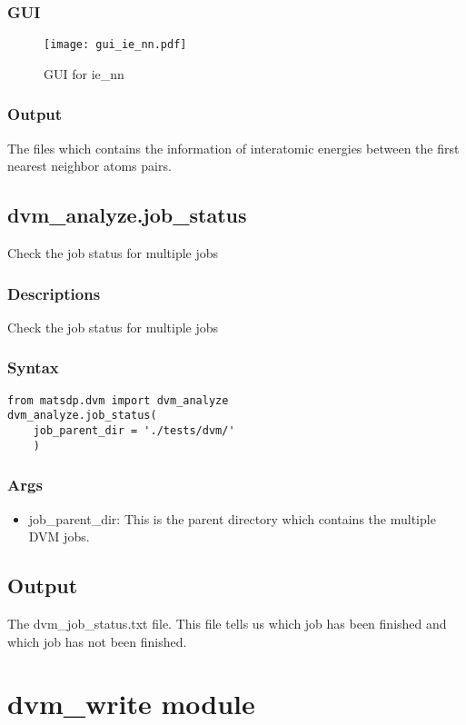 \documentclass[12pt]{book}
\begin{document}
\subsubsection{GUI}
\begin{figure}[htbp]
\centering
\texttt{[image: gui\_ie\_nn.pdf]}
\caption{GUI for ie\_nn}
\label{fig:GUI_ie_nn}
\end{figure}

\subsubsection{Output}

The files which contains the information of interatomic energies between the first nearest neighbor atoms pairs.

\subsection{dvm\_analyze.job\_status}
Check the job status for multiple jobs

\subsubsection{Descriptions}
Check the job status for multiple jobs
\subsubsection{Syntax}
\begin{lstlisting}
from matsdp.dvm import dvm_analyze
dvm_analyze.job_status(
    job_parent_dir = './tests/dvm/'
    )
\end{lstlisting}
\subsubsection{Args}
\begin{itemize}
\item job\_parent\_dir: This is the parent directory which contains the multiple DVM jobs.
\end{itemize}

\subsection{Output}
The dvm\_job\_status.txt file. This file tells us which job has been finished and which job has not been finished.

\section{dvm\_write module}
\end{document}
